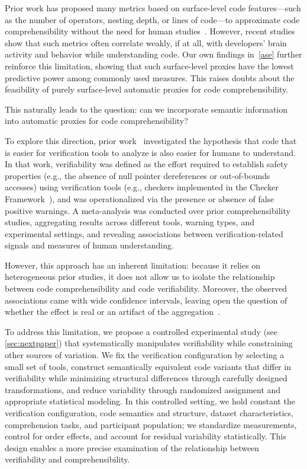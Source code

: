 Prior work has proposed many metrics based on surface-level code features---such as the number of operators, nesting depth, or lines of code---to approximate code comprehensibility without the need for human studies~\cite{ajami2019syntax, chidamber1994metrics, curtis2006measuring, henderson1995object, jbara2017programmers, nunez2017source, sneed1995understanding, zuse1993criteria}. However, recent studies~\cite{feigenspan2011exploring, peitek2021program, scalabrino2019automatically} show that such metrics often correlate weakly, if at all, with developers' brain activity and behavior while understanding code. Our own findings in~\cref{ase} further reinforce this limitation, showing that such surface-level proxies have the lowest predictive power among commonly used measures. This raises doubts about the feasibility of purely surface-level automatic proxies for code comprehensibility.

This naturally leads to the question: can we incorporate semantic information into automatic proxies for code comprehensibility?

To explore this direction, prior work~\cite{FeldmanKC2023} investigated the hypothesis that code that is easier for verification tools to analyze is also easier for humans to understand. In that work, verifiability was defined as the effort required to establish safety properties (e.g., the absence of null pointer dereferences or out-of-bounds accesses) using verification tools (e.g., checkers implemented in the Checker Framework~\cite{PapiACPE2008}), and was operationalized via the presence or absence of false positive warnings. A meta-analysis was conducted over prior comprehensibility studies, aggregating results across different tools, warning types, and experimental settings, and revealing associations between verification-related signals and measures of human understanding.

However, this approach has an inherent limitation: because it relies on heterogeneous prior studies, it does not allow us to isolate the relationship between code comprehensibility and code verifiability. Moreover, the observed associations came with wide confidence intervals, leaving open the question of whether the effect is real or an artifact of the aggregation~\cite{DeSilvaKC2026}.

To address this limitation, we propose a controlled experimental study (see \cref{sec:nextpaper}) that systematically manipulates verifiability while constraining other sources of variation. We fix the verification configuration by selecting a small set of tools, construct semantically equivalent code variants that differ in verifiability while minimizing structural differences through carefully designed transformations, and reduce variability through randomized assignment and appropriate statistical modeling. In this controlled setting, we hold constant the verification configuration, code semantics and structure, dataset characteristics, comprehension tasks, and participant population; we standardize measurements, control for order effects, and account for residual variability statistically. This design enables a more precise examination of the relationship between verifiability and comprehensibility.


